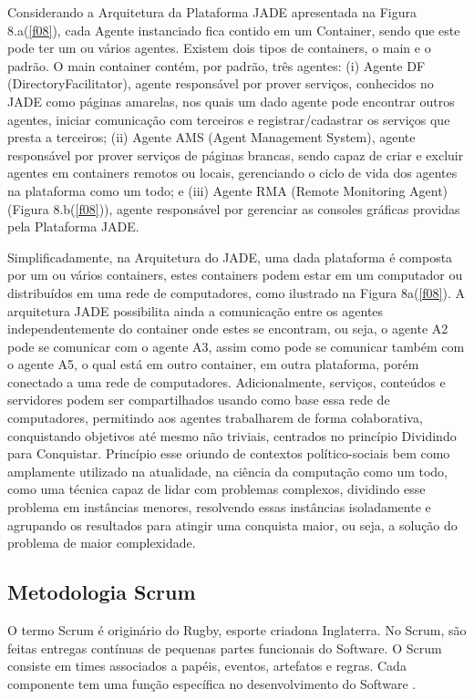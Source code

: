 Considerando a Arquitetura da Plataforma JADE apresentada na Figura 8.a(\ref{f08}), cada Agente instanciado fica contido em um Container, sendo que este pode ter um ou vários agentes. Existem dois tipos de containers, o main e o padrão. O main container contém, por padrão, três agentes: (i) Agente DF (DirectoryFacilitator), agente responsável por prover serviços, conhecidos no JADE como páginas amarelas, nos quais um dado agente pode encontrar outros agentes, iniciar comunicação com terceiros e registrar/cadastrar os serviços que presta a terceiros; (ii) Agente AMS (Agent Management System), agente responsável por prover serviços de páginas brancas, sendo capaz de criar e excluir agentes em containers remotos ou locais, gerenciando o ciclo de vida dos agentes na plataforma como um todo; e (iii) Agente RMA (Remote Monitoring Agent) (Figura 8.b(\ref{f08})), agente responsável por gerenciar as consoles gráficas providas pela Plataforma JADE.

Simplificadamente, na Arquitetura do JADE, uma dada plataforma é composta por um ou vários containers, estes containers podem estar em um computador ou distribuídos em uma rede de computadores, como ilustrado na Figura 8a(\ref{f08}). A arquitetura JADE possibilita ainda a comunicação entre os agentes independentemente do container onde estes se encontram, ou seja, o agente A2 pode se comunicar com o agente A3, assim como pode se comunicar também com o agente A5, o qual está em outro container, em outra plataforma, porém conectado a uma rede de computadores. Adicionalmente, serviços, conteúdos e servidores podem ser compartilhados usando como base essa rede de computadores, permitindo aos agentes trabalharem de forma colaborativa, conquistando objetivos até mesmo não triviais, centrados no princípio Dividindo para Conquistar. Princípio esse oriundo de contextos político-sociais bem como amplamente utilizado na atualidade, na ciência da computação como um todo, como uma técnica capaz de lidar com problemas complexos, dividindo esse problema em instâncias menores, resolvendo essas instâncias isoladamente e agrupando os resultados para atingir uma conquista maior, ou seja, a solução do problema de maior complexidade.


\subsection{Metodologia Scrum}

O termo Scrum  é originário do Rugby, esporte criadona Inglaterra. No Scrum, são feitas entregas contínuas de pequenas partes funcionais do Software. O Scrum consiste em times associados a papéis, eventos, artefatos e regras. Cada componente tem uma função específica no desenvolvimento do Software \cite{schwaber2013}.

